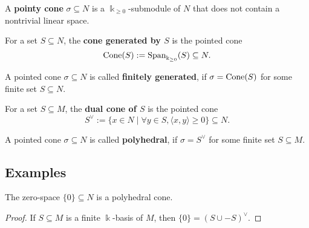 \begin{definition}
  \label{pointy-cone}
  A {\bf pointy cone} \( \sigma \subseteq N \) is a \( \Bbbk_{\geq 0}
  \)-submodule of \( N \) that does not contain a nontrivial linear space.
\end{definition}

\begin{definition}
  \label{cone-span}
  \leanok
  For a set \( S \subseteq N \), the {\bf cone generated by \( S \)}
  is the pointed cone
  \[
      \operatorname{Cone}(S) := \operatorname{Span}_{\Bbbk_{\geq 0}}(S) \subseteq N.
  \]
\end{definition}

\begin{definition}
  \label{cone-finitely-generated}
  \leanok
  A pointed cone \( \sigma \subseteq N \) is called {\bf finitely
  generated}, if \( \sigma = \operatorname{Cone}(S) \) for some finite set \( S
  \subseteq N \).
\end{definition}

\begin{definition}
  \label{dual-cone}
  \leanok
  For a set \( S \subseteq M \), the {\bf dual cone of \( S \)} is
  the pointed cone
  \[
      S^\vee := \{x \in N \mid \forall y \in S, \langle x, y \rangle
      \geq 0 \} \subseteq N.
  \]
\end{definition}

\begin{definition}
  \label{polyhedral-cone}
  \leanok
  A pointed cone \( \sigma \subseteq N \) is called {\bf polyhedral},
  if \( \sigma = S^\vee \) for some finite set \( S \subseteq M \).
\end{definition}

\subsection{Examples}

\begin{proposition}
  \label{bot-polyhedral}
  \leanok
  The zero-space \( \{0\} \subseteq N \) is a polyhedral cone.
\end{proposition}
\begin{proof}
  \uses{}
  \leanok
  If \( S \subseteq M \) is a finite \( \Bbbk \)-basis of \( M \),
  then \( \{0\} = (S \cup -S)^\vee \).
\end{proof}

